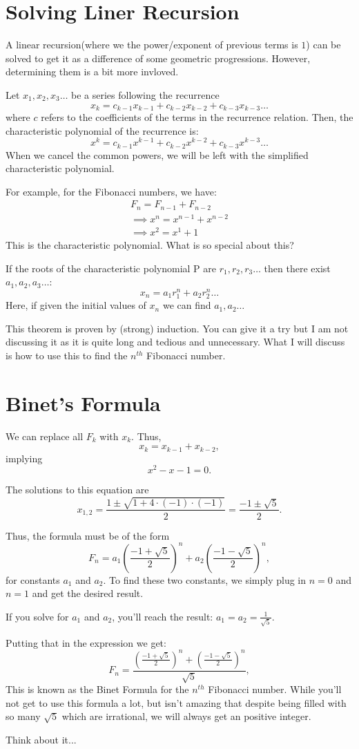 \section{Solving Liner Recursion}
A linear recursion(where we the power/exponent of previous terms is $1$) can be solved 
to get it as a difference of some geometric progressions. However, determining 
them is a bit more invloved.\par
\begin{definition}
Let $x_1,x_2,x_3 \dots$ be a series 
following the recurrence 
\[x_k=c_{k-1}x_{k-1}+c_{k-2}x_{k-2}+c_{k-3}x_{k-3} \dots\]
where $c$ refers to the coefficients of the terms in the recurrence relation. Then, 
the characteristic polynomial of the recurrence is:        
\[x^k=c_{k-1}x^{k-1}+c_{k-2}x^{k-2}+c_{k-3}x^{k-3} \dots\]
When we cancel the common powers, we will be left with the simplified characteristic polynomial.
\end{definition}
For example, for the Fibonacci numbers, we have:
\begin{align*}
F_n=F_{n-1}+F_{n-2}\\
\implies x^n=x^{n-1}+x^{n-2} \\
\implies x^2=x^1+1
\end{align*}
This is the characteristic polynomial. What is so special about this?
\begin{theorem}
If the roots of the characteristic polynomial P are $r_1, r_2, r_3 \dots$ then there exist $a_1, a_2, a_3 \dots$:
\[x_n=a_1r_1^n+a_2r_2^n \dots\]
Here, if given the initial values of $x_n$ we can find $a_1, a_2 \dots$
\end{theorem}
This theorem is proven by (strong) induction. You can give it a try but 
I am not discussing it as it is quite long and tedious and unnecessary. 
What I will discuss is how to use this to find the $n^{th}$ Fibonacci number.
\section{Binet's Formula}
We can replace all $F_k$ with $x_k$. Thus,
\[x_k = x_{k-1} + x_{k-2},\]
implying
\[
x^2 - x - 1 = 0.
\]

The solutions to this equation are
\[
x_{1,2} = \frac{1 \pm \sqrt{1 + 4 \cdot (-1) \cdot (-1)}}{2} = \frac{-1 \pm \sqrt{5}}{2}.
\]

Thus, the formula must be of the form
\[
F_n = a_1 \left(\frac{-1 + \sqrt{5}}{2}\right)^n + a_2 \left(\frac{-1 - \sqrt{5}}{2}\right)^n,
\]
for constants $a_1$ and $a_2$. To find these two constants, we simply plug in $n = 0$ and $n = 1$ and get the desired result.
\par
If you solve for $a_1$ and $a_2$, you'll reach the result: $a_1=a_2=\frac{1}{\sqrt5}$.
\par
Putting that in the expression we get:
\[
F_n = \frac{\left(\frac{-1 + \sqrt{5}}{2}\right)^n + \left(\frac{-1 - \sqrt{5}}{2}\right)^n}{\sqrt5},
\]
This is known as the Binet Formula for the $n^{th}$ Fibonacci number. 
While you'll not get to use this formula a lot, but isn't amazing that despite being 
filled with so many $\sqrt5$ which are irrational, we will always get an positive integer. \par
Think about it...
